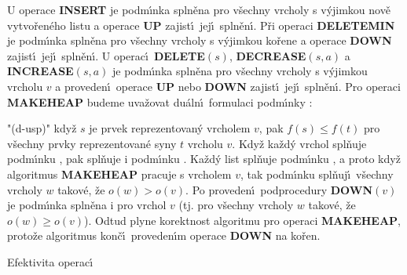 \flushpar U operace {\bf INSERT} je podm\'\i nka  spln\v ena pro v\v sechny vrcholy s v\'yjimkou nov\v e vytvo\v ren\'eho listu a operace {\bf UP} zajist\'\i\ jej\'\i\ spln\v en\'\i .  P\v ri operaci {\bf DELETEMIN} je pod\-m\'\i n\-ka  spln\v ena pro v\v sechny vrcholy s v\'yjimkou 
ko\v rene a operace {\bf DOWN} zajist\'\i\ jej\'\i\ spln\v en\'\i.  U 
operac\'\i\ {\bf DE\-LE\-TE$\left(s\right)$}, {\bf DECREASE$\left(s,a\right)$} a {\bf INCREASE$\left(s,a
\right)$} je pod\-m\'\i n\-ka  spln\v ena pro v\v sechny vrcholy s 
v\'yjimkou vrcholu $v$ a proveden\'\i\ operace {\bf UP} nebo {\bf DOWN} 
zajist\'\i\ jej\'\i\ spln\v en\'\i .  Pro operaci {\bf MAKEHEAP} budeme 
uva\v zovat du\'aln\'\i\ formulaci podm\'\i nky :
\roster
\item"{(d-usp)}"
kdy\v z $s$ je prvek reprezentovan\'y vrcholem $v$, pak 
$f\left(s\right)\le f\left(t\right)$ pro v\v sechny prvky reprezentovan\'e syny $t$
vrcholu $v$. 
\endroster
Kdy\v z ka\v zd\'y vrchol spl\v nuje podm\'\i nku , pak 
spl\v nuje i 
pod\-m\'\i nku .  Ka\v zd\'y list spl\v nuje podm\'\i nku 
, a proto kdy\v z algoritmus {\bf MAKEHEAP} pracuje s 
vrcholem $v$, tak podm\'\i nku  spl\v nuj\'\i\ v\v sechny 
vrcholy $w$ takov\'e, \v ze $o\left(w\right)>o\left(v\right)$.  Po proveden\'\i\ podprocedury 
{\bf DOWN$\left(v\right)$} je podm\'\i nka  spln\v ena i pro vrchol $
v$ (tj.  
pro v\v sechny vrcholy $w$ takov\'e, \v ze $o\left(w\right)\ge o\left(v\right)$).  Odtud plyne 
korektnost algoritmu pro operaci {\bf MAKEHEAP}, proto\v ze 
algoritmus kon\v c\'\i\ proveden\'\i m operace {\bf DOWN} na ko\v ren.  
\medskip

\subhead 
Efektivita operac\'\i
\endsubhead
\smallskip 

